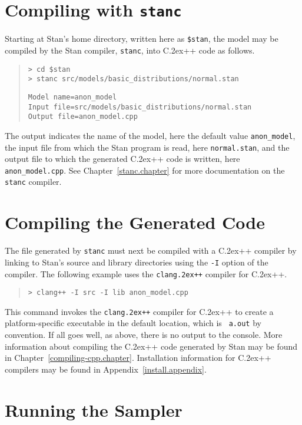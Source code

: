 \documentclass[10pt]{report}
\newcommand{\Stan}{Stan\xspace}
\newcommand{\stanc}{{\tt stanc}\xspace}
\newcommand*{\Cpp}{C\raise.2ex\hbox{\footnotesize ++}\xspace} %
\newcommand{\clang}{{\tt clang\raise.2ex\hbox{\footnotesize ++}}\xspace}
\newcommand{\code}[1]{{\tt #1}}
\newcommand{\refappendix}[1]{Appendix~\ref{#1.appendix}}
\newcommand{\refchapter}[1]{Chapter~\ref{#1.chapter}}
\begin{document}
\section{Compiling  with {\tt\bfseries stanc}}

Starting at Stan's home directory, written here as {\tt \$stan},
the model may be compiled by the Stan compiler, \stanc, into \Cpp code
as follows.
%
\begin{quote}
\begin{Verbatim}[fontshape=sl]
> cd $stan
> stanc src/models/basic_distributions/normal.stan
\end{Verbatim}
%
\begin{Verbatim}
Model name=anon_model
Input file=src/models/basic_distributions/normal.stan
Output file=anon_model.cpp
\end{Verbatim}
\end{quote}
%
The output indicates the name of the model, here the default value
\code{anon\_model}, the input file from which the Stan program is
read, here \code{normal.stan}, and the output file to which the
generated \Cpp code is written, here \code{anon\_model.cpp}.  See
\refchapter{stanc} for more documentation on the \stanc compiler.

\section{Compiling the Generated Code}

The file generated by \stanc must next be compiled with a \Cpp
compiler by linking to \Stan's source and library directories using
the {\tt -I} option of the compiler.  The following example 
uses the \clang compiler for \Cpp.
%
\begin{quote}
\begin{Verbatim}[fontshape=sl]
> clang++ -I src -I lib anon_model.cpp 
\end{Verbatim}
\end{quote}
%
This command invokes the \clang compiler for \Cpp to create a
platform-specific executable in the default location, which is {\tt
  a.out} by convention.  If all goes well, as above, there is no
output to the console.  More information about compiling the \Cpp code
generated by Stan may be found in \refchapter{compiling-cpp}.
Installation information for \Cpp compilers may be found in
\refappendix{install}.

\section{Running the Sampler}
\end{document}
